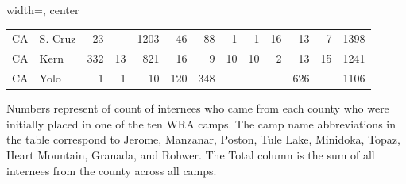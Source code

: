 \begin{table}[ht]
\begin{adjustbox}{width=\textwidth, center}
\begin{tabular}{|ll|r|r|r|r|r|r|r|r|r|r|r|}
    CA & S. Cruz &  23 &  & 1203 &  46 &  88 &   1 &   1 &  16 &  13 &   7 & 1398 \\ 
    CA & Kern & 332 &  13 & 821 &  16 &   9 &  10 &  10 &   2 &  13 &  15 & 1241 \\ 
    CA & Yolo &   1 &   1 &  10 & 120 & 348 &  &  &  & 626 &  & 1106 \\ 
     \hline
  \end{tabular}
\end{adjustbox}
  \footnotesize
  Numbers represent of count of internees who came from each county who were initially placed in one of the ten WRA camps.
  The camp name abbreviations in the table correspond to Jerome, Manzanar, Poston, Tule Lake, Minidoka, Topaz, Heart Mountain, Granada, and Rohwer.
  The Total column is the sum of all internees from the county across all camps.
\end{table}
    